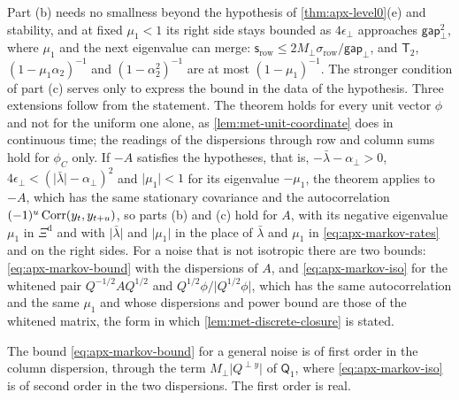 Part (b) needs no smallness beyond the hypothesis of \cref{thm:apx-level0}(e) and stability, and at fixed $\mu_1<1$ its right side stays bounded as $4\epsilon_\perp$ approaches $\mathsf{gap}_\perp^2$, where $\mu_1$ and the next eigenvalue can merge: $\mathsf s_{\mathrm{row}}\le2M_\perp\sigma_{\mathrm{row}}/\mathsf{gap}_\perp$, and $\mathsf T_2$, $(1-\mu_1\alpha_2)^{-1}$ and $(1-\alpha_2^2)^{-1}$ are at most $(1-\mu_1)^{-1}$. The stronger condition of part (c) serves only to express the bound in the data of the hypothesis. Three extensions follow from the statement. The theorem holds for every unit vector $\phi$ and not for the uniform one alone, as \cref{lem:met-unit-coordinate} does in continuous time; the readings of the dispersions through row and column sums hold for $\phi_C$ only. If $-A$ satisfies the hypotheses, that is, $-\bar\lambda-\alpha_\perp>0$, $4\epsilon_\perp<(\lvert\bar\lambda\rvert-\alpha_\perp)^2$ and $\lvert\mu_1\rvert<1$ for its eigenvalue $-\mu_1$, the theorem applies to $-A$, which has the same stationary covariance and the autocorrelation $(-1)^u\operatorname{Corr}(y_t,y_{t+u})$, so parts (b) and (c) hold for $A$, with its negative eigenvalue $\mu_1$ in $\Xi^{\mathrm d}$ and with $\lvert\bar\lambda\rvert$ and $\lvert\mu_1\rvert$ in the place of $\bar\lambda$ and $\mu_1$ in \eqref{eq:apx-markov-rates} and on the right sides. For a noise that is not isotropic there are two bounds: \eqref{eq:apx-markov-bound} with the dispersions of $A$, and \eqref{eq:apx-markov-iso} for the whitened pair $Q^{-1/2}AQ^{1/2}$ and $Q^{1/2}\phi/\lvert Q^{1/2}\phi\rvert$, which has the same autocorrelation and the same $\mu_1$ and whose dispersions and power bound are those of the whitened matrix, the form in which \cref{lem:met-discrete-closure} is stated.

The bound \eqref{eq:apx-markov-bound} for a general noise is of first order in the column dispersion, through the term $M_\perp\lvert Q^{\perp y}\rvert$ of $\mathsf Q_1$, where \eqref{eq:apx-markov-iso} is of second order in the two dispersions. The first order is real.

